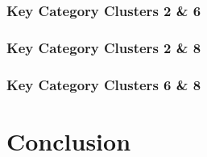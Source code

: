 \documentclass[11pt, twoside]{article}
\numberwithin{equation}{section}
\numberwithin{table}{section}
\numberwithin{figure}{section}
\begin{document}
%
\subsubsection{Key Category Clusters 2 \& 6} \label{sssec:kcc_26}
%
\subsubsection{Key Category Clusters 2 \& 8} \label{sssec:kcc_28}
%
\subsubsection{Key Category Clusters 6 \& 8} \label{sssec:kcc_68}
%
%
%
\newpage
\thispagestyle{empty}
\cleardoublepage


\fancyhf{}
\fancyhead[LO,RE]{\footnotesize \nouppercase{\leftmark}}
\fancyhead[RO,LE]{\footnotesize \thepage}


\thispagestyle{plain}
\section{Conclusion} \label{sec:conclusion}
%
\newpage
\thispagestyle{empty}
\cleardoublepage


\fancyhf{}
\fancyhead[LO]{\footnotesize \nouppercase{\rightmark}}
\fancyhead[RE]{\footnotesize \nouppercase{\leftmark}}
\fancyhead[RO,LE]{\footnotesize \thepage}



%
\end{document}
